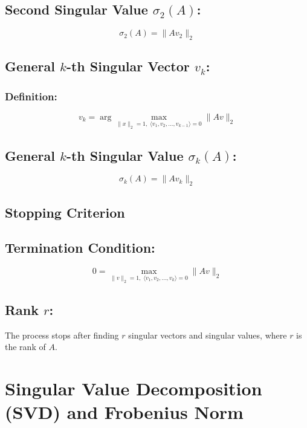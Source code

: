 \documentclass{article}
\begin{document}
\subsection*{Second Singular Value $\sigma_2(A)$:}
\[
\sigma_2(A) = \|Av_2\|_2
\]

\subsection*{General $k$-th Singular Vector $v_k$:}
\subsubsection*{Definition:}
\[
v_k = \arg \max_{\|x\|_2=1,\; \langle v_1,v_2,\ldots,v_{k-1} \rangle=0} \|Av\|_2
\]

\subsection*{General $k$-th Singular Value $\sigma_k(A)$:}
\[
\sigma_k(A) = \|Av_k\|_2
\]

\subsection*{Stopping Criterion}
\subsection*{Termination Condition:}
\[
0 = \max_{\|v\|_2=1,\; \langle v_1,v_2,\ldots,v_k \rangle=0} \|Av\|_2
\]

\subsection*{Rank $r$:} The process stops after finding $r$ singular vectors and singular values, where $r$ is the rank of $A$.










\section*{Singular Value Decomposition (SVD) and Frobenius Norm}
\end{document}
